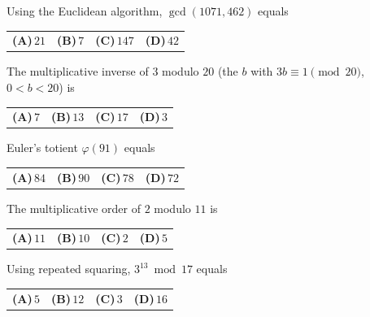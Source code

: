 \documentclass[11pt,a4paper]{article}
\newcommand{\optlabel}[1]{\textbf{(#1)}}
\newenvironment{qitem}[1]{\begin{list}{}{\setlength{\leftmargin}{3.3em}\setlength{\labelwidth}{3.1em}%
  \setlength{\labelsep}{0.2em}\setlength{\topsep}{3pt}\setlength{\parsep}{3pt}}\item[\textbf{Q.#1}\hfill]}{\end{list}}
\newcommand{\qsep}{\par\vspace{2pt}{\color{black!15}\hrule}\vspace{4pt}}
\begin{document}
\begin{qitem}{1}
Using the Euclidean algorithm, $\gcd(1071, 462)$ equals
\par\smallskip\noindent\begin{tabularx}{\linewidth}{@{}*{4}{L}@{}}
\optlabel{A}\,$21$ & \optlabel{B}\,$7$ & \optlabel{C}\,$147$ & \optlabel{D}\,$42$
\end{tabularx}
\end{qitem}
\qsep

\begin{qitem}{2}
The multiplicative inverse of $3$ modulo $20$ (the $b$ with $3b \equiv 1 \pmod{20}$, $0 < b < 20$) is
\par\smallskip\noindent\begin{tabularx}{\linewidth}{@{}*{4}{L}@{}}
\optlabel{A}\,$7$ & \optlabel{B}\,$13$ & \optlabel{C}\,$17$ & \optlabel{D}\,$3$
\end{tabularx}
\end{qitem}
\qsep

\begin{qitem}{3}
Euler's totient $\varphi(91)$ equals
\par\smallskip\noindent\begin{tabularx}{\linewidth}{@{}*{4}{L}@{}}
\optlabel{A}\,$84$ & \optlabel{B}\,$90$ & \optlabel{C}\,$78$ & \optlabel{D}\,$72$
\end{tabularx}
\end{qitem}
\qsep

\begin{qitem}{4}
The multiplicative order of $2$ modulo $11$ is
\par\smallskip\noindent\begin{tabularx}{\linewidth}{@{}*{4}{L}@{}}
\optlabel{A}\,$11$ & \optlabel{B}\,$10$ & \optlabel{C}\,$2$ & \optlabel{D}\,$5$
\end{tabularx}
\end{qitem}
\qsep

\begin{qitem}{5}
Using repeated squaring, $3^{13} \bmod 17$ equals
\par\smallskip\noindent\begin{tabularx}{\linewidth}{@{}*{4}{L}@{}}
\optlabel{A}\,$5$ & \optlabel{B}\,$12$ & \optlabel{C}\,$3$ & \optlabel{D}\,$16$
\end{tabularx}
\end{qitem}
\qsep
\end{document}
